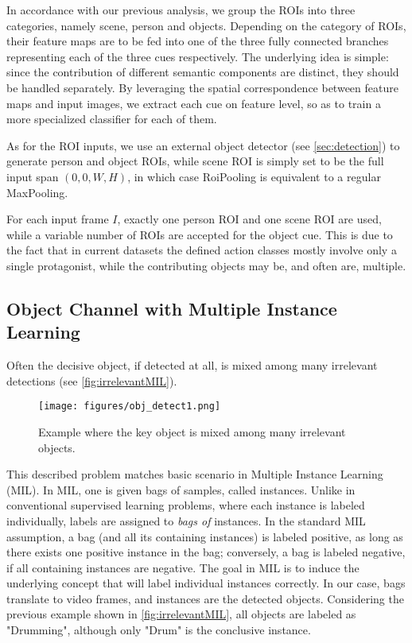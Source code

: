 In accordance with our previous analysis, we group the ROIs into three categories, namely scene, person and objects. 
Depending on the category of ROIs, their feature maps are to be fed into one of the three fully connected branches representing each of the three cues respectively.
The underlying idea is simple: since the contribution of different semantic components are distinct, they should be handled separately. 
By leveraging the spatial  correspondence between feature maps and input images, we extract each cue on feature level, so as to train a more specialized classifier for each of them. 

As for the ROI inputs, we use an external object detector (see \autoref{sec:detection}) to generate person and object ROIs, while scene ROI is simply set to be the full input span $ \left(0, 0, W, H\right) $, in which case RoiPooling is equivalent to a regular MaxPooling.


For each input frame $ I $, exactly one person ROI and one scene ROI are used, while a variable number of ROIs are accepted for the object cue. 
This is due to the fact that in current datasets the defined action classes mostly involve only a single protagonist, while the contributing objects may be, and often are, multiple. 

\subsection{Object Channel with Multiple Instance Learning}
Often the decisive object, if detected at all, is mixed among many irrelevant detections (see \autoref{fig:irrelevantMIL}).
\begin{figure}
\centering
\texttt{[image: figures/obj\_detect1.png]}
\caption[Example of object detections]{Example where the key object is mixed among many irrelevant objects.}\label{fig:irrelevantMIL}
\end{figure}
This described problem matches basic scenario in Multiple Instance Learning (MIL). 
In MIL, one is given bags of samples, called instances.
Unlike in conventional supervised learning problems, where each instance is labeled individually, labels are assigned to \textit{bags of} instances.
In the standard MIL assumption, a bag (and all its containing instances) is labeled positive, as long as there exists one positive instance in the bag; conversely, a bag is labeled negative, if all containing instances are negative.
The goal in MIL is to induce the underlying concept that will label individual instances correctly. 
In our case, bags translate to video frames, and instances are the detected objects.
Considering the previous example shown in \autoref{fig:irrelevantMIL}, all objects are labeled as "Drumming", although only "Drum" is the conclusive instance.

